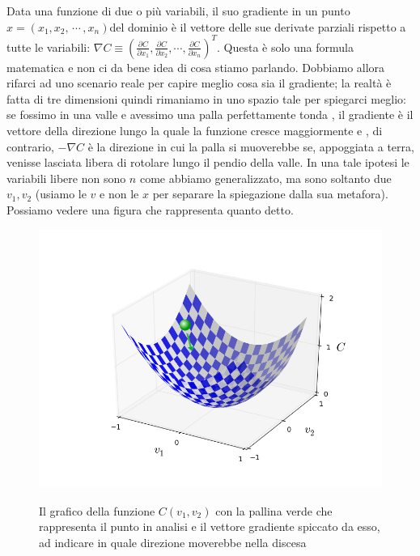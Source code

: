 Data una funzione di due o più variabili, il suo gradiente in un punto $x=(x_{1}, x_{2},\, \cdots \, , x_{n})$del dominio è il vettore delle sue derivate parziali rispetto a tutte le variabili: $\nabla C \equiv (\frac{\partial C}{\partial x_{1}}, \frac{\partial C}{\partial x_{2}}, \cdots, \frac{\partial C}{\partial x_{n}})^{T}$. Questa è solo una formula matematica e non ci da bene idea di cosa stiamo parlando. Dobbiamo allora rifarci ad uno scenario reale per capire meglio cosa sia il gradiente; la realtà è fatta di tre dimensioni quindi rimaniamo in uno spazio tale per spiegarci meglio: se fossimo in una valle e avessimo una palla perfettamente tonda , il gradiente è il vettore della direzione lungo la quale la funzione cresce maggiormente e , di contrario, $-\nabla C$ è la direzione in cui la palla si muoverebbe se, appoggiata a terra, venisse lasciata libera di rotolare lungo il pendio della valle. In una tale ipotesi le variabili libere non sono $n$ come abbiamo generalizzato, ma sono soltanto due $v_{1}, v_{2}$ (usiamo le $v$ e non le $x$ per separare la spiegazione dalla sua metafora). Possiamo vedere una figura che rappresenta quanto detto.

\begin{figure}[hbtb]
\centering
{\includegraphics[width=.45\textwidth]{media_tesi/valley_with_ball.png}}
\caption{Il grafico della funzione $C(v_{1}, v_{2})$ con la pallina verde che rappresenta il punto in analisi e il vettore gradiente spiccato da esso, ad indicare in quale direzione moverebbe nella discesa}
\label{fig:subfig}
\end{figure}

